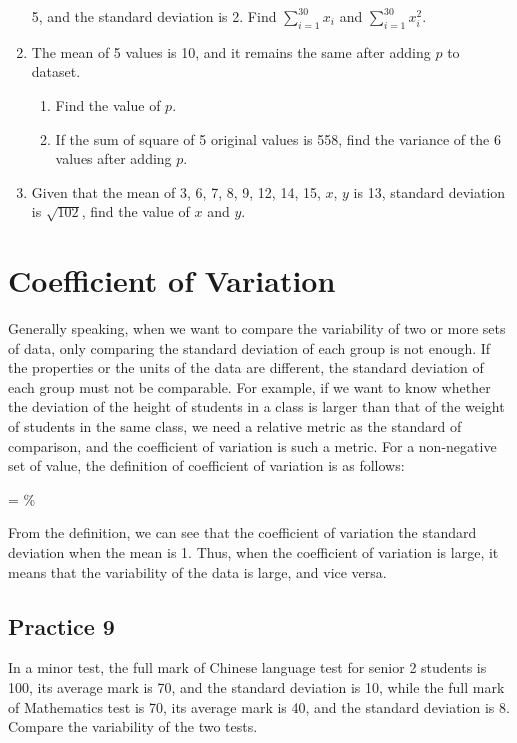 \documentclass{report}
\begin{document}
\begin{multicols}{2}
\begin{enumerate}
          5, and the standard deviation is 2. Find $\sum_{i=1}^{30} x_i$ and
          $\sum_{i=1}^{30} x_i^2$.
    \item The mean of 5 values is 10, and it remains the same after adding $p$ to
          dataset.
          \begin{enumerate}
            \item Find the value of $p$.
            \item If the sum of square of 5 original values is 558, find the variance of the 6
                  values after adding $p$.
          \end{enumerate}
    \item Given that the mean of 3, 6, 7, 8, 9, 12, 14, 15, $x$, $y$ is 13, standard
          deviation is $\sqrt{102}$, find the value of $x$ and $y$.
  \end{enumerate}

  \section{Coefficient of Variation}

  Generally speaking, when we want to compare the variability of two or more sets
  of data, only comparing the standard deviation of each group is not enough. If
  the properties or the units of the data are different, the standard deviation
  of each group must not be comparable. For example, if we want to know whether
  the deviation of the height of students in a class is larger than that of the
  weight of students in the same class, we need a relative metric as the standard
  of comparison, and the coefficient of variation is such a metric. For a
  non-negative set of value, the definition of coefficient of variation is as
  follows:
  \begin{cequation}
     =  \%
  \end{cequation}

  From the definition, we can see that the coefficient of variation the standard
  deviation when the mean is 1. Thus, when the coefficient of variation is large,
  it means that the variability of the data is large, and vice versa.

  \subsection{Practice 9}

  In a minor test, the full mark of Chinese language test for senior 2 students
  is 100, its average mark is 70, and the standard deviation is 10, while the
  full mark of Mathematics test is 70, its average mark is 40, and the standard
  deviation is 8. Compare the variability of the two tests.


\end{multicols}
\end{document}
